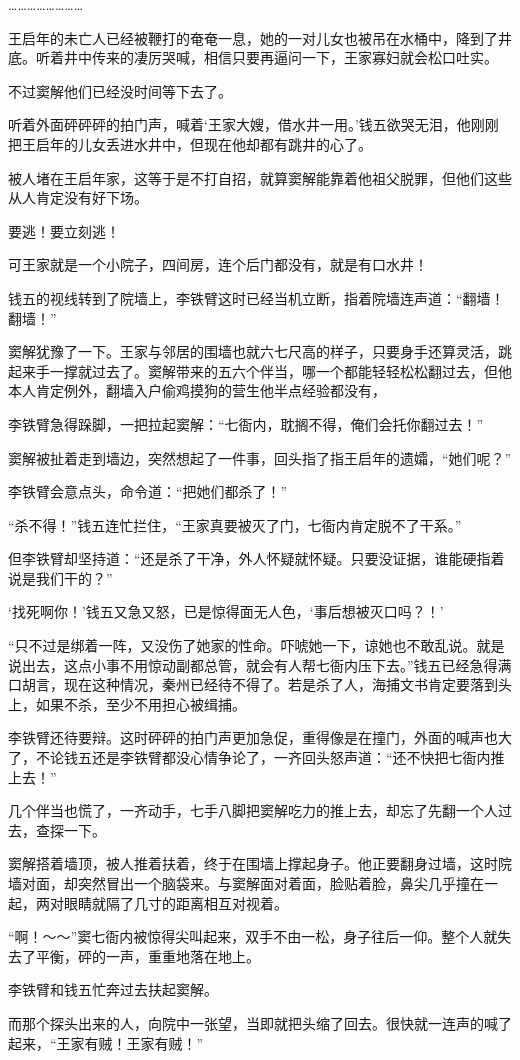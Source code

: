 ……………………

王启年的未亡人已经被鞭打的奄奄一息，她的一对儿女也被吊在水桶中，降到了井底。听着井中传来的凄厉哭喊，相信只要再逼问一下，王家寡妇就会松口吐实。

不过窦解他们已经没时间等下去了。

听着外面砰砰砰的拍门声，喊着‘王家大嫂，借水井一用。’钱五欲哭无泪，他刚刚把王启年的儿女丢进水井中，但现在他却都有跳井的心了。

被人堵在王启年家，这等于是不打自招，就算窦解能靠着他祖父脱罪，但他们这些从人肯定没有好下场。

要逃！要立刻逃！

可王家就是一个小院子，四间房，连个后门都没有，就是有口水井！

钱五的视线转到了院墙上，李铁臂这时已经当机立断，指着院墙连声道：“翻墙！翻墙！”

窦解犹豫了一下。王家与邻居的围墙也就六七尺高的样子，只要身手还算灵活，跳起来手一撑就过去了。窦解带来的五六个伴当，哪一个都能轻轻松松翻过去，但他本人肯定例外，翻墙入户偷鸡摸狗的营生他半点经验都没有，

李铁臂急得跺脚，一把拉起窦解：“七衙内，耽搁不得，俺们会托你翻过去！”

窦解被扯着走到墙边，突然想起了一件事，回头指了指王启年的遗孀，“她们呢？”

李铁臂会意点头，命令道：“把她们都杀了！”

“杀不得！”钱五连忙拦住，“王家真要被灭了门，七衙内肯定脱不了干系。”

但李铁臂却坚持道：“还是杀了干净，外人怀疑就怀疑。只要没证据，谁能硬指着说是我们干的？”

‘找死啊你！’钱五又急又怒，已是惊得面无人色，‘事后想被灭口吗？！’

“只不过是绑着一阵，又没伤了她家的性命。吓唬她一下，谅她也不敢乱说。就是说出去，这点小事不用惊动副都总管，就会有人帮七衙内压下去。”钱五已经急得满口胡言，现在这种情况，秦州已经待不得了。若是杀了人，海捕文书肯定要落到头上，如果不杀，至少不用担心被缉捕。

李铁臂还待要辩。这时砰砰的拍门声更加急促，重得像是在撞门，外面的喊声也大了，不论钱五还是李铁臂都没心情争论了，一齐回头怒声道：“还不快把七衙内推上去！”

几个伴当也慌了，一齐动手，七手八脚把窦解吃力的推上去，却忘了先翻一个人过去，查探一下。

窦解搭着墙顶，被人推着扶着，终于在围墙上撑起身子。他正要翻身过墙，这时院墙对面，却突然冒出一个脑袋来。与窦解面对着面，脸贴着脸，鼻尖几乎撞在一起，两对眼睛就隔了几寸的距离相互对视着。

“啊！～～”窦七衙内被惊得尖叫起来，双手不由一松，身子往后一仰。整个人就失去了平衡，砰的一声，重重地落在地上。

李铁臂和钱五忙奔过去扶起窦解。

而那个探头出来的人，向院中一张望，当即就把头缩了回去。很快就一连声的喊了起来，“王家有贼！王家有贼！”

